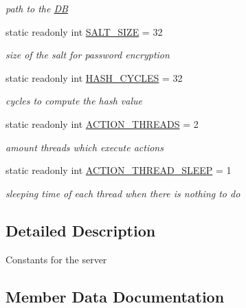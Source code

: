 \begin{DoxyCompactItemize}
\begin{DoxyCompactList}\small\item\em path to the \hyperlink{namespaceServer_1_1DB}{D\+B} \end{DoxyCompactList}\item 
static readonly int \hyperlink{classServer_1_1Models_1_1ServerConstants_a2627c643caf77b36fed32b74811438f2}{S\+A\+L\+T\+\_\+\+S\+I\+Z\+E} = 32
\begin{DoxyCompactList}\small\item\em size of the salt for password encryption \end{DoxyCompactList}\item 
static readonly int \hyperlink{classServer_1_1Models_1_1ServerConstants_a6b08db695329ec9edee41fa9d4275458}{H\+A\+S\+H\+\_\+\+C\+Y\+C\+L\+E\+S} = 32
\begin{DoxyCompactList}\small\item\em cycles to compute the hash value \end{DoxyCompactList}\item 
static readonly int \hyperlink{classServer_1_1Models_1_1ServerConstants_a1bfe8a7a369636cf459ee5769273b2b2}{A\+C\+T\+I\+O\+N\+\_\+\+T\+H\+R\+E\+A\+D\+S} = 2
\begin{DoxyCompactList}\small\item\em amount threads which execute actions \end{DoxyCompactList}\item 
static readonly int \hyperlink{classServer_1_1Models_1_1ServerConstants_a5e2befbb0254cde1849bcc0a328fb91b}{A\+C\+T\+I\+O\+N\+\_\+\+T\+H\+R\+E\+A\+D\+\_\+\+S\+L\+E\+E\+P} = 1
\begin{DoxyCompactList}\small\item\em sleeping time of each thread when there is nothing to do \end{DoxyCompactList}\end{DoxyCompactItemize}


\subsection{Detailed Description}
Constants for the server 



\subsection{Member Data Documentation}
\hypertarget{classServer_1_1Models_1_1ServerConstants_a5e2befbb0254cde1849bcc0a328fb91b}{}
